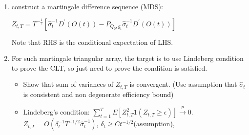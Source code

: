 \documentclass{article}
\begin{document}
\begin{enumerate}
    \item construct a martingale difference sequence (MDS): 
    
    $Z_{t,T}=T^{-\frac{1}{2}}[\hat{\sigma}_t^{-1}D^\prime(O(t))-P_{Q_0,g_t}\hat{\sigma}_t^{-1}D^\prime(O(t))]$

    Note that RHS is the conditional expectation of LHS.
    \item For such martingale triangular array, the target is to use Lindeberg condition to prove the CLT, so just need to prove the condition is satisfied.
    \begin{itemize}
        \item Show that sum of variances of $Z_{t,T}$ is convergent. (Use assumption that $\hat{\sigma}_t$ is consistent and non degenerate efficiency bound) 
        \item Lindeberg's condition: $\sum_{t=1}^T E[Z_{t,T}^2 1(Z_{t,T}\geq \epsilon)] \xrightarrow{p}0$.
        $Z_{t,T}=O(\delta_t^{-1}T^{-1/2}\hat{\sigma}_t^{-1})$, $\delta_t \geq Ct^{-1/2}$(assumption), 
    \end{itemize}

\end{enumerate}
\end{document}

